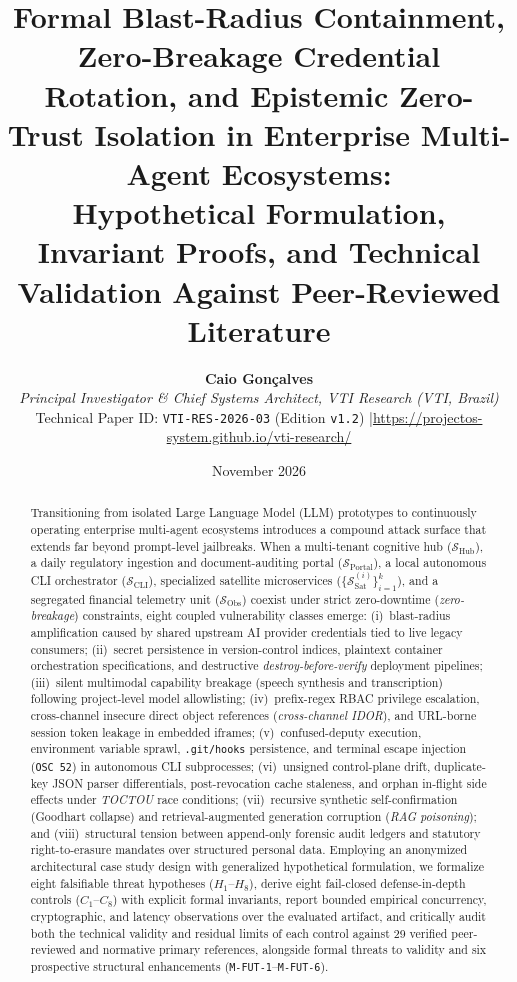\documentclass[10pt,twocolumn]{article}
\title{\Large\bfseries Formal Blast-Radius Containment, Zero-Breakage Credential Rotation, and Epistemic Zero-Trust Isolation in Enterprise Multi-Agent Ecosystems:\\[0.25em]
\large Hypothetical Formulation, Invariant Proofs, and Technical Validation Against Peer-Reviewed Literature}
\author{%
  \textbf{Caio Gon\c{c}alves}\\
  \textit{Principal Investigator \& Chief Systems Architect, VTI Research (VTI, Brazil)}\\
  \small Technical Paper ID: \texttt{VTI-RES-2026-03} (Edition \texttt{v1.2}) \quad|\quad \url{https://projectos-system.github.io/vti-research/}
}
\date{November 2026}
\begin{document}
\nocite{R01,R02,R03,R04,R05,R06,R07,R08,R09,R10,R11,R12,R13,R14,R15,R16,R17,R18,R19,R20,R21,R22,R23,R24,R25,R26,R27,R28,R29}

\maketitle

\begin{abstract}
\noindent Transitioning from isolated Large Language Model (LLM) prototypes to continuously operating enterprise multi-agent ecosystems introduces a compound attack surface that extends far beyond prompt-level jailbreaks. When a multi-tenant cognitive hub ($\mathcal{S}_{\mathrm{Hub}}$), a daily regulatory ingestion and document-auditing portal ($\mathcal{S}_{\mathrm{Portal}}$), a local autonomous CLI orchestrator ($\mathcal{S}_{\mathrm{CLI}}$), specialized satellite microservices ($\{\mathcal{S}_{\mathrm{Sat}}^{(i)}\}_{i=1}^{k}$), and a segregated financial telemetry unit ($\mathcal{S}_{\mathrm{Obs}}$) coexist under strict zero-downtime (\emph{zero-breakage}) constraints, eight coupled vulnerability classes emerge: (i)~blast-radius amplification caused by shared upstream AI provider credentials tied to live legacy consumers; (ii)~secret persistence in version-control indices, plaintext container orchestration specifications, and destructive \emph{destroy-before-verify} deployment pipelines; (iii)~silent multimodal capability breakage (speech synthesis and transcription) following project-level model allowlisting; (iv)~prefix-regex RBAC privilege escalation, cross-channel insecure direct object references (\emph{cross-channel IDOR}), and URL-borne session token leakage in embedded iframes; (v)~confused-deputy execution, environment variable sprawl, \texttt{.git/hooks} persistence, and terminal escape injection (\texttt{OSC 52}) in autonomous CLI subprocesses; (vi)~unsigned control-plane drift, duplicate-key JSON parser differentials, post-revocation cache staleness, and orphan in-flight side effects under \emph{TOCTOU} race conditions; (vii)~recursive synthetic self-confirmation (Goodhart collapse) and retrieval-augmented generation corruption (\emph{RAG poisoning}); and (viii)~structural tension between append-only forensic audit ledgers and statutory right-to-erasure mandates over structured personal data. Employing an anonymized architectural case study design with generalized hypothetical formulation, we formalize eight falsifiable threat hypotheses ($H_1$--$H_8$), derive eight fail-closed defense-in-depth controls ($C_1$--$C_8$) with explicit formal invariants, report bounded empirical concurrency, cryptographic, and latency observations over the evaluated artifact, and critically audit both the technical validity and residual limits of each control against 29 verified peer-reviewed and normative primary references, alongside formal threats to validity and six prospective structural enhancements (\texttt{M-FUT-1}--\texttt{M-FUT-6}).


\end{abstract}
\end{document}
